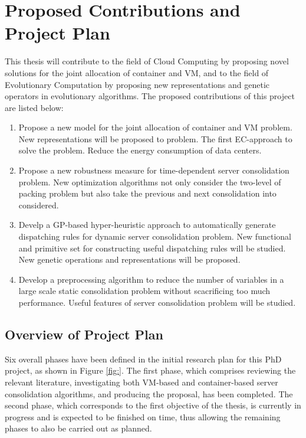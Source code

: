 \chapter{Proposed Contributions and Project Plan}\label{C:con}

This thesis will contribute to the field of Cloud Computing by proposing novel solutions for the joint allocation of container and VM, and to the field of Evolutionary Computation by proposing new representations and genetic operators in evolutionary algorithms. The proposed contributions of this project are listed below:

\begin{enumerate}
	\item Propose a new model for the joint allocation of container and VM problem.
	New representations will be proposed to problem.
	The first EC-approach to solve the problem. 
	Reduce the energy consumption of data centers.
	\item Propose a new robustness measure for time-dependent server consolidation problem. New optimization algorithms not only consider the two-level of packing problem but also take the previous and next consolidation into considered.
	\item Develp a GP-based hyper-heuristic approach to automatically generate dispatching rules for dynamic server consolidation problem. New functional and primitive set for constructing useful dispatching rules will be studied. New genetic operations and representations will be proposed.
	\item Develop a preprocessing algorithm to reduce the number of variables in a large scale static consolidation problem without scacrificing too much performance. Useful features of server consolidation problem will be studied.
\end{enumerate}

\section{Overview of Project Plan}
Six overall phases have been defined in the initial research plan for this PhD project, as
shown in Figure \ref{fig:}. The first phase, which comprises reviewing the relevant literature, investigating both VM-based and container-based server consolidation algorithms, and producing the proposal, has
been completed. The second phase, which corresponds to the first objective of the thesis, is
currently in progress and is expected to be finished on time, thus allowing the remaining
phases to also be carried out as planned.

